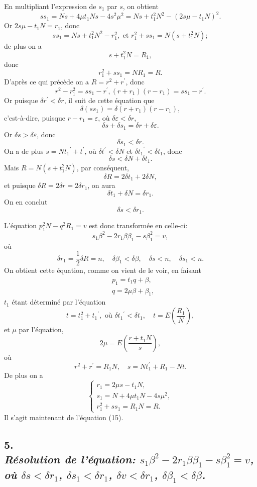 \documentclass[oneside, 12 pt, leqno]{memoir}
\begin{document}
En multipliant l'expression de \(s_1\) par \(s\), on obtient
\[s s_1=N s+4 \mu t_1 N s-4 s^2 \mu^2=N s+t_1^2 N^2-\left(2 s \mu-t_1 N\right)^2.\]
Or \(2 s \mu-t_1 N=r_1\), donc
\[s s_1=N s+t_1^2 N^2-r_1^2, \text { et } r_1^2+s s_1=N\left(s+t_1^2 N\right);\]
de plus on a
\[s+t_1^2 N=R_1,\]
donc
\[\tag{16} r_1^2+s s_1 = N R_1 = R.\]
D'après ce qui précède on a \(R=r^2+r^{\prime}\), donc
\[r^2-r_1^2=s s_1-r^{\prime},\left(r+r_1\right)\left(r-r_1\right)=s s_1-r^{\prime}.\]
Or puisque \(\delta r^{\prime}<\delta r\), il suit de cette équation que
\[\delta\left(s s_1\right)=\delta\left(r+r_1\right)\left(r-r_1\right),\]
c'est-à-dire, puisque \(r-r_1=\varepsilon\), où \(\delta \varepsilon<\delta r\),
\[\delta s+\delta s_1=\delta r+\delta \varepsilon.\]
Or \(\delta s > \delta \varepsilon\), donc
\[\delta s_1 < \delta r.\]
On a de plus \(s=N {t_1}^{\prime}+t^{\prime}\), où \(\delta t^{\prime}<\delta N\) et \({\delta t_1}^{\prime}<\delta t_1\), donc
\[\delta s< \delta N+\delta t_1.\]
Mais \(R=N\left(s+t_1^2 N\right)\), par conséquent,
\[\delta R=2 \delta t_1+2 \delta N,\]
et puisque \(\delta R=2 \delta r=2 \delta r_1\), on aura
\[\delta t_1+\delta N=\delta r_1.\]
On en conclut
\[\delta s< \delta r_1.\]

L'équation \(p_1^2 N-q^2 R_1=v\) est donc transformée en celle-ci:
\[s_1 \beta^2-2 r_1 \beta \beta_1-s \beta_1^2=v,\]
où
\[\delta r_1=\frac{1}{2} \delta R=n, \quad \delta \beta_1<\delta \beta, \quad \delta s<n, \quad \delta s_1<n.\]
On obtient cette équation, comme on vient de le voir, en faisant
\[\tag{17}\begin{aligned}
& p_1=t_1 q+\beta, \\
& q=2 \mu \beta+\beta_1,
\end{aligned}\]
\(t_1\) étant déterminé par l'équation
\[t=t_1^2+{t_1}^{\prime}, \text { où } \delta {t_1}^{\prime}<\delta t_1, \quad t=E\left(\frac{R_1}{N}\right),\]
et \(\mu\) par l'équation,
\[2 \mu=E\left(\frac{r+t_1 N}{s}\right),\]
où
\[r^2+r^{\prime}=R_1 N, \quad s=N t_1^{\prime}+R_1-N t.\]
De plus on a
\[\tag{18}\left\{\begin{array}{l}
r_1=2 \mu s-t_1 N, \\
s_1=N+4 \mu t_1 N-4 s \mu^2, \\
r_1^2+s s_1=R_1 N=R.
\end{array}\right.\]
Il s'agit maintenant de l'équation (15).

\subsection*{5.\\
{\scriptsize \textit{Résolution de l'équation: \(s_1 \beta^2-2 r_1 \beta \beta_1-s \beta_1^2=v\), où \(\delta s<\delta r_1\), \(\delta s_1<\delta r_1\), \(\delta v<\delta r_1\), \(\delta \beta_1<\delta \beta \).}}}
\end{document}
